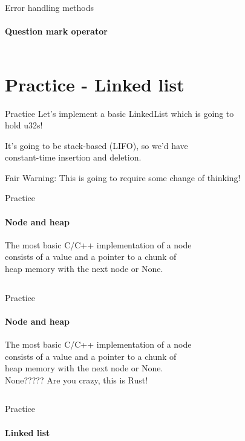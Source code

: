 \documentclass[usenames,dvipsnames,10pt,aspectratio=169]{beamer}
\begin{document}
\begin{frame}{Error handling methods}
\framesubtitle{Question mark operator}
\inputminted[fontsize=\large]{rust}{code/error6.rs}
\end{frame}


\section{Practice - Linked list}

\begin{frame}{Practice}
\large
Let's implement a basic LinkedList which is going to\\
hold \textcolor{ucuyellow}{u32}s!
\vspace{0.2cm}

It's going to be stack-based (LIFO), so we'd have\\
constant-time insertion and deletion.
\vspace{0.2cm}

Fair Warning: This is going to require some change of thinking!
\end{frame}

\begin{frame}{Practice}
\framesubtitle{Node and heap}
\large
The most basic C/C++ implementation of a node\\
consists of a value and a pointer to a chunk of\\
heap memory with the next node or None.
\vspace{0.2cm}
\inputminted[fontsize=\large]{rust}{code/list1.rs}
\end{frame}

\begin{frame}{Practice}
\framesubtitle{Node and heap}
\large
The most basic C/C++ implementation of a node\\
consists of a value and a pointer to a chunk of\\
heap memory with the next node or None.\\
\vspace{0.2cm}
\textcolor{ucuyellow}{None????? Are you crazy, this is Rust!}
\vspace{0.2cm}
\inputminted[fontsize=\large]{rust}{code/list2.rs}
\end{frame}

\begin{frame}{Practice}
\framesubtitle{Linked list}
\inputminted[fontsize=\normalsize]{rust}{code/list3.rs}
\vspace{0.5cm}
\inputminted[fontsize=\normalsize]{rust}{code/list4.rs}
\vspace{0.5cm}
\end{frame}
\end{document}
